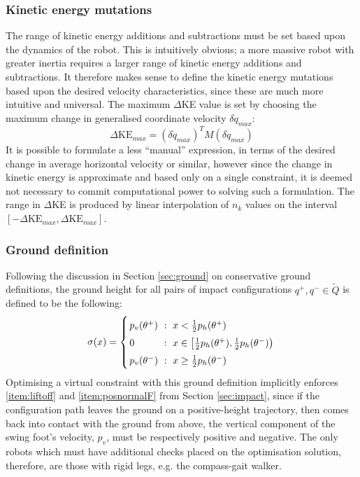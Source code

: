 \subsubsection{Kinetic energy mutations}
The range of kinetic energy additions and subtractions must be set based upon the dynamics of the robot. This is intuitively obvious; a more massive robot with greater inertia requires a larger range of kinetic energy additions and subtractions. It therefore makes sense to define the kinetic energy mutations based upon the desired velocity characteristics, since these are much more intuitive and universal. The  maximum $\Delta$KE value is set by choosing the maximum change in generalised coordinate velocity $\delta\dot{q}_{max}$:
\begin{equation}
	\Delta\mathrm{KE}_{max} = (\delta\dot{q}_{max})^T M (\delta\dot{q}_{max})
\end{equation}
It is possible to formulate a less ``manual'' expression, in terms of the desired change in average horizontal velocity or similar, however since the change in kinetic energy is approximate and based only on a single constraint, it is deemed not necessary to commit computational power to solving such a formulation. The range in $\Delta$KE is produced by linear interpolation of $n_k$ values on the interval $[-\Delta\mathrm{KE}_{max},\Delta\mathrm{KE}_{max}]$.

\subsubsection{Ground definition}
Following the discussion in Section \ref{sec:ground} on conservative ground definitions, the ground height for all pairs of impact configurations $q^+, q^- \in \tilde{Q}$ is defined to be the following:
\begin{equation}
	\arraycolsep=1.4pt\def\arraystretch{1.5}
	\sigma(x) = \left\{
		\begin{array}{l c l}
			p_v(\theta^+) &~:~& x < \tfrac{1}{2}p_h(\theta^+) \\
			0 &~:~& x \in \left[\tfrac{1}{2}p_h(\theta^+), \tfrac{1}{2}p_h(\theta^-)\right) \\
			p_v(\theta^-) &~:~& x \geq \tfrac{1}{2}p_h(\theta^-)
		\end{array}
	\right.
\end{equation}
Optimising a virtual constraint with this ground definition implicitly enforces \ref{item:liftoff} and \ref{item:posnormalF} from Section \ref{sec:impact}, since if the configuration path leaves the ground on a positive-height trajectory, then comes back into contact with the ground from above, the vertical component of the swing foot's velocity, $p_v$, must be respectively positive and negative. The only robots which must have additional checks placed on the optimisation solution, therefore, are those with rigid legs, e.g. the compass-gait walker.

